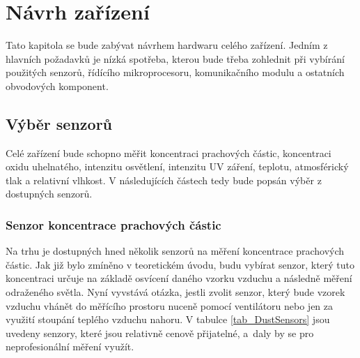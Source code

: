 \chapter{Návrh zařízení}

Tato kapitola se bude zabývat návrhem hardwaru celého zařízení. Jedním z hlavních požadavků je nízká spotřeba, kterou bude třeba zohlednit při vybírání použitých senzorů, řídícího mikroprocesoru, komunikačního modulu a ostatních obvodových komponent. 

\section{Výběr senzorů}
Celé zařízení bude schopno měřit koncentraci prachových částic, koncentraci oxidu uhelnatého, intenzitu osvětlení, intenzitu UV záření, teplotu, atmosférický tlak a relativní vlhkost. V následujících částech tedy bude popsán výběr z dostupných senzorů.

\subsection{Senzor koncentrace prachových částic}

Na trhu je dostupných hned několik senzorů na měření koncentrace prachových částic. Jak již bylo zmíněno v teoretickém úvodu, budu vybírat senzor, který tuto koncentraci určuje na základě osvícení daného vzorku vzduchu a následně měření odraženého světla. Nyní vyvstává otázka, jestli zvolit senzor, který bude vzorek vzduchu vhánět do měřícího prostoru nuceně pomocí ventilátoru nebo jen za využití stoupání teplého vzduchu nahoru. V tabulce \ref{tab_DustSensors} jsou uvedeny senzory, které jsou relativně cenově přijatelné, a~daly by se pro neprofesionální měření využít.

\newcommand{\ugcm}{\micro\gram\per\cubic\meter} %

